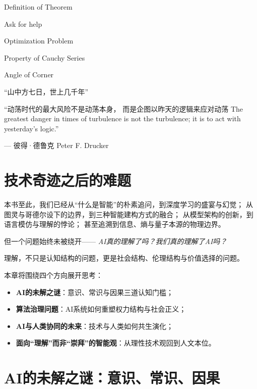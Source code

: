 
 \begin{introduction}
  \item Definition of Theorem
  \item Ask for help
  \item Optimization Problem
  \item Property of Cauchy Series
  \item Angle of Corner
\end{introduction}

“山中方七日，世上几千年”

“动荡时代的最大风险不是动荡本身， 而是企图以昨天的逻辑来应对动荡
The greatest danger in times of turbulence is not the turbulence; it is to act with yesterday’s logic.”
\begin{flushright}
— 彼得·德鲁克 Peter F. Drucker
\end{flushright}


\section*{技术奇迹之后的难题}

本书至此，我们已经从“什么是智能”的朴素追问，到深度学习的盛宴与幻觉；  
从图灵与哥德尔设下的边界，到三种智能建构方式的融合；  
从模型架构的创新，到语言模仿与理解的悖论；  
甚至追溯到信息、熵与量子本源的物理边界。


但一个问题始终未被绕开—— \textit{AI真的理解了吗？我们真的理解了AI吗？}

理解，不只是认知结构的问题，更是社会结构、伦理结构与价值选择的问题。

本章将围绕四个方向展开思考：

\begin{itemize}
\item \textbf{AI的未解之谜}：意识、常识与因果三道认知门槛；
\item \textbf{算法治理问题}：AI系统如何重塑权力结构与社会正义；
\item \textbf{AI与人类协同的未来}：技术与人类如何共生演化；
\item \textbf{面向“理解”而非“崇拜”的智能观}：从理性技术观回到人文本位。
\end{itemize}


\section{AI的未解之谜：意识、常识、因果}

